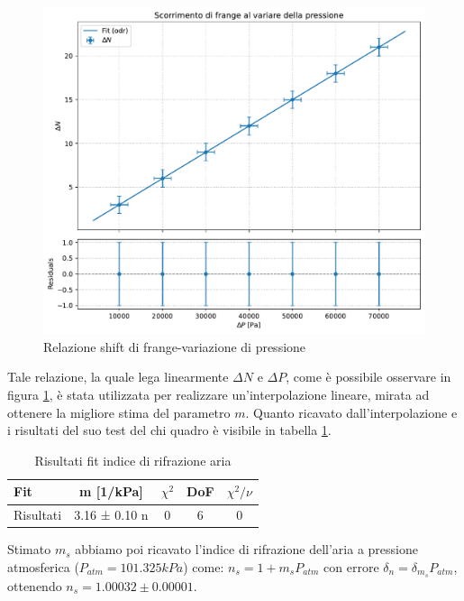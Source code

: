 \documentclass[a4paper]{article}
\begin{document}
\begin{figure}[htbp]
\centering
\includegraphics[width=1.0\textwidth]{./grafici/indice_aria.pdf}
\caption{Relazione shift di frange-variazione di pressione}
\label{fig: indice aria}
\end{figure}

Tale relazione, la quale lega linearmente $\Delta N$ e $\Delta P$, come è possibile osservare in figura \ref{fig: indice aria}, è stata utilizzata per realizzare un'interpolazione lineare, mirata ad ottenere la migliore stima del parametro $m$.
Quanto ricavato dall'interpolazione e i risultati del suo test del chi quadro è visibile in tabella \ref{tab: fit indice rifrazione aria}.

\begin{table}[htbp]
\centering
\caption{Risultati fit indice di rifrazione aria}
\label{tab: fit indice rifrazione aria}
\begin{tabular}{|l|cccc|}
\hline
Fit & m [1/kPa] & $\chi^2$ & DoF & $\chi^2/\nu$ \\\hline\hline
Risultati & 3.16 ± 0.10 n & 0 & 6 & 0 \\\hline
\end{tabular}
\end{table}

Stimato $m_s$ abbiamo poi ricavato l'indice di rifrazione dell'aria a pressione atmosferica ($P_{atm}= 101.325 kPa$) come:
$n_s = 1+m_sP_{atm}$ con errore $\delta_n = \delta_{m_s}P_{atm}$, ottenendo $n_s =1.00032 \pm 0.00001$.
\end{document}
